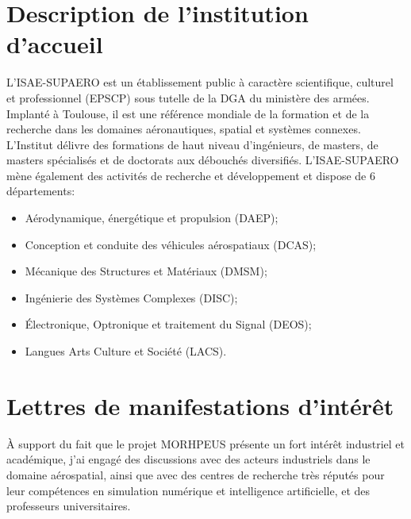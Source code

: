 \documentclass[12pt, french]{article}
\begin{document}
	
	
	
	
	\section{Description de l'institution d'accueil}
	
	L'ISAE-SUPAERO est un établissement public à caractère scientifique, culturel et professionnel (EPSCP) sous tutelle de la DGA du ministère des armées. Implanté à Toulouse, il est une référence mondiale de la formation et de la recherche dans les domaines aéronautiques, spatial et systèmes connexes. L'Institut délivre des
	formations de haut niveau d'ingénieurs, de masters, de masters spécialisés et de doctorats aux débouchés diversifiés. L'ISAE-SUPAERO mène également des activités de recherche et développement et dispose de 6 départements:
	\begin{itemize}
		\item Aérodynamique, énergétique et propulsion (DAEP);
		\item Conception et conduite des véhicules aérospatiaux (DCAS);
		\item Mécanique des Structures et Matériaux (DMSM);
		\item Ingénierie des Systèmes Complexes (DISC); 
		\item Électronique, Optronique et traitement du Signal (DEOS);
		\item Langues Arts Culture et Société (LACS).
	\end{itemize}

	\appendix
	
	\section{Lettres de manifestations d'intérêt}
	
	\`A support du fait que le projet MORHPEUS présente un fort intérêt industriel et académique, j'ai engagé des discussions avec des acteurs industriels dans le domaine aérospatial, ainsi que avec des centres de recherche très réputés pour leur compétences en simulation numérique et intelligence artificielle, et des professeurs universitaires. 
	
\end{document}
